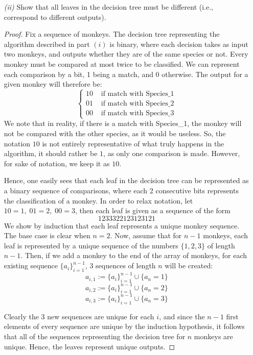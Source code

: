 \documentclass[12pt]{article}
\theoremstyle{definition}
\theoremstyle{remark}
\begin{document}
\begin{enumerate}
\begin{enumerate}
    \item[\it (ii)] Show that all leaves in the decision tree must be different (i.e., correspond to different outputs).
\begin{proof} 
    Fix a sequence of monkeys. The decision tree representing the algorithm described in part $(i)$ is binary, where each decision takes as input two monkeys, and outputs whether they are of the same species or not. Every monkey must be compared at most twice to be classified. We can represent each comparison by a bit, 1 being a match, and 0 otherwise. The output for a given monkey will therefore be: 
   $$\left\{ \begin{matrix}
     10 & \text{ if match with Species\_1} \\ 
01 & \text{ if match with Species\_2} \\ 
00 & \text{ if match with Species\_3} 
   \end{matrix} \right.$$
    We note that in reality, if there is a match with Species\_1, the monkey will not be compared with the other species, as it would be useless. So, the notation $10$ is not entirely representative of what truly happens in the algorithm, it should rather be $1$, as only one comparison is made. However, for sake of notation, we keep it as $10.$

    \hspace{24pt}Hence, one easily sees that each leaf in the decision tree can be represented as a binary sequence of comparisons, where each 2 consecutive bits represents the classification of a monkey. In order to relax notation, let $10 = 1, \; 01 = 2,\; 00 = 3 $, then each leaf is given as a sequence of the form
    $$1233322123123121$$
    We show by induction that each leaf represents a unique monkey sequence. The base case is clear when $n =2$. Now, assume that for $n-1$ monkeys, each leaf is represented by a unique sequence of the numbers $\{1,2,3\}$ of length $n-1$. Then, if we add a monkey to the end of the array of monkeys, for each existing sequence $\{a_i\}_{i=1}^{n-1}$, 3 sequences of length $n$ will be created: 
    $$a_{i,1} := \{a_i\}_{i=1}^{n-1}\cup \{a_n = 1\}  $$
  $$a_{i,2} := \{a_i\}_{i=1}^{n-1}\cup \{a_n = 2\}  $$
  $$a_{i,3} := \{a_i\}_{i=1}^{n-1}\cup \{a_n = 3\}  $$

  Clearly the 3 new sequences are unique for each $i$, and since the $n-1$ first elements of every sequence are unique by the induction hypothesis, it follows that all of the sequences representing the decision tree for $n$ monkeys are unique. Hence, the leaves represent unique outputs. 


\end{proof}
\end{enumerate}
\end{enumerate}
\end{document}
